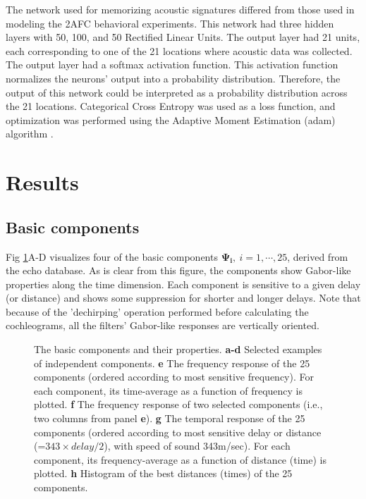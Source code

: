 \documentclass[10pt,letterpaper]{article}
\begin{document}
The network used for memorizing acoustic signatures differed from those used in modeling the 2AFC behavioral experiments. This network had three hidden layers with 50, 100, and 50 Rectified Linear Units. The output layer had 21 units, each corresponding to one of the 21 locations where acoustic data was collected. The output layer had a softmax activation function. This activation function normalizes the neurons' output into a probability distribution. Therefore, the output of this network could be interpreted as a probability distribution across the 21 locations. Categorical Cross Entropy was used as a loss function, and optimization was performed using the Adaptive Moment Estimation (adam) algorithm \cite{Kingma2014}.

\section*{Results}

\subsection*{Basic components}

Fig \ref{fig:analysefilters}A-D visualizes four of the basic components $\mathbf{\Psi_i},\ i=1, \cdots, 25$, derived from the echo database. As is clear from this figure, the components show Gabor-like properties along the time dimension. Each component is sensitive to a given delay (or distance) and shows some suppression for shorter and longer delays. Note that because of the 'dechirping' operation performed before calculating the cochleograms, all the filters' Gabor-like responses are vertically oriented. 

\begin{figure}
	\centering
	\caption{The basic components and their properties. \textbf{a-d} Selected examples of independent components. \textbf{e} The frequency response of the 25 components (ordered according to most sensitive frequency). For each component, its time-average as a function of frequency is plotted. \textbf{f} The frequency response of two selected components (i.e., two columns from panel \textbf{e}). \textbf{g} The temporal response of the 25 components (ordered according to most sensitive delay or distance (=$343\times delay/2$), with speed of sound 343m/sec). For each component, its frequency-average as a function of distance (time) is plotted. \textbf{h} Histogram of the best distances (times) of the 25 components.}
	\label{fig:analysefilters}
\end{figure}
\end{document}
